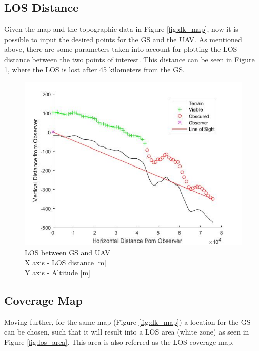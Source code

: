 \subsection{LOS Distance}
Given the map and the topographic data in Figure \ref{fig:dk_map}, now it is possible to input the desired points for the GS and the UAV. As mentioned above, there are some parameters taken into account for plotting the LOS distance between the two points of interest. This distance can be seen in Figure \ref{fig:los_2p}, where the LOS is lost after 45 kilometers from the GS.

\begin{figure}[h]
	\centering
	\includegraphics[scale=0.75]{figures/los_2p.jpg}
	\caption{LOS between GS and UAV \\ X axis - LOS distance [m] \\ Y axis - Altitude [m]}
   	\label{fig:los_2p}
\end{figure}

\subsection{Coverage Map}
Moving further, for the same map (Figure \ref{fig:dk_map}) a location for the GS can be chosen, such that it will result into a LOS area (white zone) as seen in Figure \ref{fig:los_area}. This area is also referred as the LOS coverage map.

